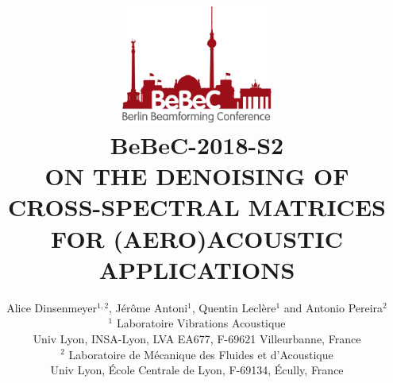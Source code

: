 \documentclass[fontsize=12pt,DIV13,paper=a4,abstract=true,titlepage=false]{scrartcl}
\begin{document}
\def\papernumber{BeBeC-2018-S2}
\title{%
\vspace{-30mm} %
\includegraphics[width=50mm]{logo_BeBeC_lrg_CMYK}\\
\null\vspace{-54mm}
{\hfill\large{\papernumber}}\\
\vspace{45mm}
\Large{
ON THE DENOISING OF CROSS-SPECTRAL MATRICES FOR (AERO)ACOUSTIC APPLICATIONS
}}

\author{
 \normalsize{Alice Dinsenmeyer$^{1,2}$, Jérôme Antoni$^1$, Quentin Leclère$^1$ and  Antonio Pereira$^2$}\\[-0.4em]
 \small{$^1$ Laboratoire Vibrations Acoustique}\\[-0.4em]
 \small{Univ Lyon, INSA-Lyon, LVA EA677, F-69621 Villeurbanne, France}\\[-0.4em]
 \small{$^2$ Laboratoire de Mécanique des Fluides et d’Acoustique }\\[-0.4em]
 \small{Univ Lyon, École Centrale de Lyon, F-69134, Écully, France}
\date{}
}
\end{document}
